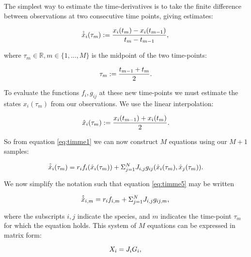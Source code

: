 The simplest way to estimate the time-derivatives is to take the finite difference between observations at two consecutive time points, giving estimates:

\begin{equation}\label{eq:timme2}
\hat{\dot{x}}_{i}(\tau_m) := \frac{x_i(t_m) - x_i(t_{m-1})}{t_m - t_{m-1}},\\
\end{equation}

where $\tau_m \in{\mathbb{R}}, m \in{\{1,...,M\}}$ is the midpoint of the two time-points:

\begin{equation}\label{eq:timme3}
\tau_m := \frac{t_{m-1} + t_{m}}{2}.\\
\end{equation}

To evaluate the functions $f_i, g_{ij}$ at these new time-points we must estimate the states $x_i(\tau_m)$ from our observations. We use the linear interpolation:

\begin{equation}\label{eq:timme4}
\hat{x}_{i}(\tau_m) := \frac{x_i(t_{m-1}) + x_i(t_{m})}{2}.\\
\end{equation}

So from equation \ref{eq:timme1} we can now construct $M$ equations using our $M+1$ samples:

\begin{equation}\label{eq:timme5}
\hat{\dot{x}}_{i}(\tau_m) = r_if_{i}(\hat{x}_i(\tau_m)) + \Sigma_{j=1}^{N}J_{i,j}g_{ij}(\hat{x}_i(\tau_m), \hat{x}_j(\tau_m)).\\
\end{equation}

We now simplify the notation such that equation \ref{eq:timme5} may be written 

\begin{equation}\label{eq:timme6}
\hat{\dot{x}}_{i,m} = r_if_{i,m} + \Sigma_{j=1}^{N}J_{i,j}g_{ij,m},\\
\end{equation}

where the subscripts  $i,j$ indicate the species, and $m$ indicates the time-point $\tau_m$ for which the equation holds. This system of $M$ equations can be expressed in matrix form:

\begin{equation}\label{eq:timme7}
X_{i} = J_iG_i,\\
\end{equation}

